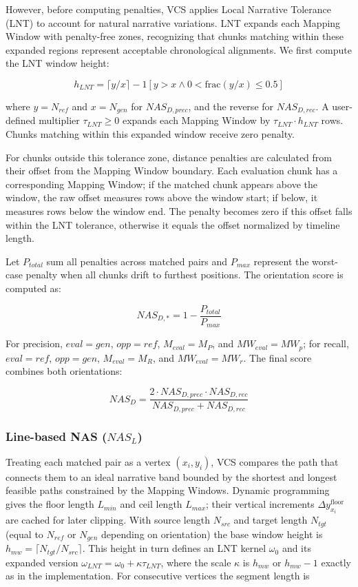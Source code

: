 \documentclass[main.tex]{subfiles}
\begin{document}
However, before computing penalties, VCS applies Local Narrative Tolerance (LNT) to account for natural narrative variations. LNT expands each Mapping Window with penalty-free zones, recognizing that chunks matching within these expanded regions represent acceptable chronological alignments. We first compute the LNT window height:

\begin{equation}
h_{LNT} = \lceil y/x \rceil - 1[y > x \land 0 < \text{frac}(y/x) \leq 0.5]
\end{equation}

where $y = N_{ref}$ and $x = N_{gen}$ for $NAS_{D,prec}$, and the reverse for $NAS_{D,rec}$. A user-defined multiplier $\tau_{LNT} \geq 0$ expands each Mapping Window by $\tau_{LNT} \cdot h_{LNT}$ rows. Chunks matching within this expanded window receive zero penalty.

For chunks outside this tolerance zone, distance penalties are calculated from their offset from the Mapping Window boundary. Each evaluation chunk has a corresponding Mapping Window; if the matched chunk appears above the window, the raw offset measures rows above the window start; if below, it measures rows below the window end. The penalty becomes zero if this offset falls within the LNT tolerance, otherwise it equals the offset normalized by timeline length.

Let $P_{total}$ sum all penalties across matched pairs and $P_{max}$ represent the worst-case penalty when all chunks drift to furthest positions. The orientation score is computed as:

\begin{equation}
NAS_{D,*} = 1 - \frac{P_{total}}{P_{max}}
\end{equation}

For precision, $eval = gen$, $opp = ref$, $M_{eval} = M_P$, and $MW_{eval} = MW_p$; for recall, $eval = ref$, $opp = gen$, $M_{eval} = M_R$, and $MW_{eval} = MW_r$. The final score combines both orientations:

\begin{equation}
NAS_D = \frac{2 \cdot NAS_{D,prec} \cdot NAS_{D,rec}}{NAS_{D,prec} + NAS_{D,rec}}
\end{equation}

\subsubsection{Line-based NAS ($NAS_L$)}
Treating each matched pair as a vertex $(x_i, y_i)$, VCS compares the path that connects them to an ideal narrative band bounded by the shortest and longest feasible paths constrained by the Mapping Windows. Dynamic programming gives the floor length $L_{min}$ and ceil length $L_{max}$; their vertical increments $\Delta y_{x_i}^{\text{floor}}$ are cached for later clipping. With source length $N_{src}$ and target length $N_{tgt}$ (equal to $N_{ref}$ or $N_{gen}$ depending on orientation) the base window height is $h_{mw} = \lceil N_{tgt}/N_{src} \rceil$. This height in turn defines an LNT kernel $\omega_0$ and its expanded version $\omega_{LNT} = \omega_0 + \kappa \tau_{LNT}$, where the scale $\kappa$ is $h_{mw}$ or $h_{mw} - 1$ exactly as in the implementation. For consecutive vertices the segment length is
\end{document}
